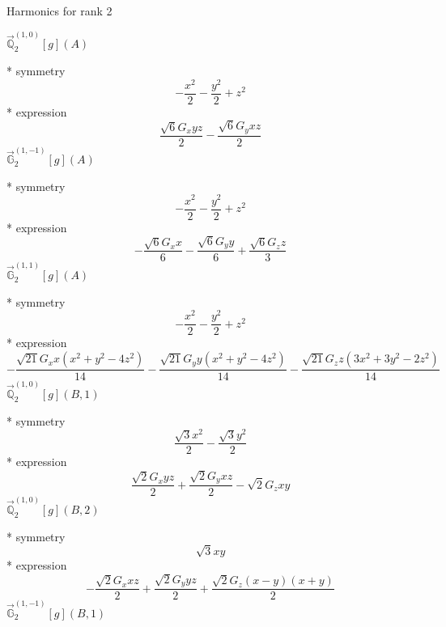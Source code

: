 \documentclass[fleqn,8pt]{jsarticle}
\begin{document}
\noindent * Harmonics for rank 2

\noindent\quad $\vec{\mathbb{Q}}_{2}^{(1,0)}[g](A)$

\noindent\quad ** symmetry
\begin{dmath*}
- \frac{x^{2}}{2} - \frac{y^{2}}{2} + z^{2}
\end{dmath*}
\noindent\quad ** expression
\begin{dmath*}
\frac{\sqrt{6} G_{x} y z}{2} - \frac{\sqrt{6} G_{y} x z}{2}
\end{dmath*}
\noindent\quad $\vec{\mathbb{G}}_{2}^{(1,-1)}[g](A)$

\noindent\quad ** symmetry
\begin{dmath*}
- \frac{x^{2}}{2} - \frac{y^{2}}{2} + z^{2}
\end{dmath*}
\noindent\quad ** expression
\begin{dmath*}
- \frac{\sqrt{6} G_{x} x}{6} - \frac{\sqrt{6} G_{y} y}{6} + \frac{\sqrt{6} G_{z} z}{3}
\end{dmath*}
\noindent\quad $\vec{\mathbb{G}}_{2}^{(1,1)}[g](A)$

\noindent\quad ** symmetry
\begin{dmath*}
- \frac{x^{2}}{2} - \frac{y^{2}}{2} + z^{2}
\end{dmath*}
\noindent\quad ** expression
\begin{dmath*}
- \frac{\sqrt{21} G_{x} x \left(x^{2} + y^{2} - 4 z^{2}\right)}{14} - \frac{\sqrt{21} G_{y} y \left(x^{2} + y^{2} - 4 z^{2}\right)}{14} - \frac{\sqrt{21} G_{z} z \left(3 x^{2} + 3 y^{2} - 2 z^{2}\right)}{14}
\end{dmath*}
\noindent\quad $\vec{\mathbb{Q}}_{2}^{(1,0)}[g](B,1)$

\noindent\quad ** symmetry
\begin{dmath*}
\frac{\sqrt{3} x^{2}}{2} - \frac{\sqrt{3} y^{2}}{2}
\end{dmath*}
\noindent\quad ** expression
\begin{dmath*}
\frac{\sqrt{2} G_{x} y z}{2} + \frac{\sqrt{2} G_{y} x z}{2} - \sqrt{2} G_{z} x y
\end{dmath*}
\noindent\quad $\vec{\mathbb{Q}}_{2}^{(1,0)}[g](B,2)$

\noindent\quad ** symmetry
\begin{dmath*}
\sqrt{3} x y
\end{dmath*}
\noindent\quad ** expression
\begin{dmath*}
- \frac{\sqrt{2} G_{x} x z}{2} + \frac{\sqrt{2} G_{y} y z}{2} + \frac{\sqrt{2} G_{z} \left(x - y\right) \left(x + y\right)}{2}
\end{dmath*}
\noindent\quad $\vec{\mathbb{G}}_{2}^{(1,-1)}[g](B,1)$
\end{document}
